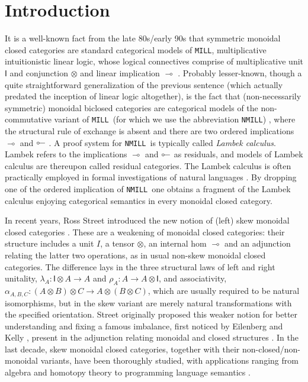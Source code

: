 \documentclass[submission,copyright,creativecommons]{eptcs}
\theoremstyle{definition}
\newcommand{\ot}{\otimes}
\newcommand{\lolli}{\multimap}
\newcommand{\illol}{\rotatebox[origin=c]{180}{$\multimap$}}
\newcommand{\I}{\mathsf{I}}
\newcommand{\MILL}{\texttt{MILL}}
\newcommand{\NMILL}{\texttt{NMILL}}
\begin{document}
\section{Introduction}
It is a well-known fact from the late 80s/early 90s that symmetric monoidal closed categories are standard categorical models of \MILL, multiplicative intuitionistic linear logic, whose logical connectives comprise of multiplicative unit $\I$ and conjunction $\ot$ and linear implication $\lolli$ \cite{mellies:categorical:09}. Probably lesser-known, though a quite straightforward generalization of the previous sentence (which actually predated the inception of linear logic altogether), is the fact that (non-necessarily symmetric) monoidal biclosed categories are categorical models of the non-commutative variant of \MILL\ (for which we use the abbreviation \NMILL) \cite{abrusci:noncommutative:1990}, where the structural rule of exchange is absent and there are two ordered implications $\lolli$ and $\illol$ \cite{lambek:deductive:68}. A proof system for \NMILL\ is typically called \emph{Lambek calculus}. Lambek refers to the implications $\lolli$ and $\illol$ as residuals, and models of Lambek calculus are thereupon called residual categories. The Lambek calculus is often practically employed in formal investigations of natural languages \cite{lambek:mathematics:58}.
By dropping one of the ordered implication of \NMILL\ one obtains a fragment of the Lambek calculus enjoying categorical semantics in every monoidal closed category.

In recent years, Ross Street introduced the new notion of (left) skew monoidal closed categories \cite{street:skew-closed:2013}. These are a weakening of monoidal closed categories: their structure includes a unit $I$, a tensor $\ot$, an internal hom $\lolli$ and an adjunction relating the latter two operations, as in usual non-skew monoidal closed categories. The difference lays in the three structural laws of left and right unitality, $\lambda_A : \I \ot A \to A$ and $\rho_A : A \to A \ot \I$, and associativity, $\alpha_{A,B,C} : (A \ot B) \ot C \to A \ot (B \ot C)$, which are usually required to be natural isomorphisms, but in the skew variant are merely natural transformations with the specified orientation. Street originally proposed this weaker notion for better understanding and fixing a famous imbalance, first noticed by Eilenberg and Kelly \cite{eilenberg:closed:1966}, present in the adjunction relating monoidal and closed structures \cite{street:skew-closed:2013,uustalu:eilenberg-kelly:2020}. In the last decade, skew monoidal closed categories, together with their non-closed/non-monoidal variants, have been thoroughly studied, with applications ranging from algebra and homotopy theory to programming language semantics \cite{szlachanyi:skew-monoidal:2012,lack:skew:2012,lack:triangulations:2014,altenkirch:monads:2014,buckley:catalan:2015,bourke:skew:2017,bourke:skew:2018,tomita:realizability:21}.
\end{document}
